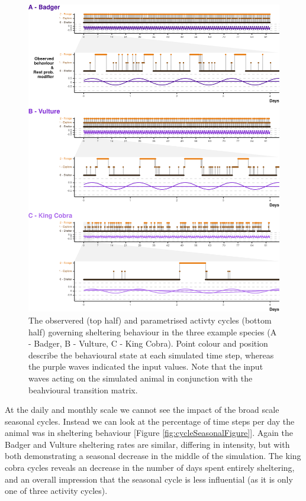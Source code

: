 \documentclass[10pt,a4paper]{article}
\begin{document}
\begin{figure}

{\centering \includegraphics{Agent-based_model_walkthrough_files/figure-latex/cycleFigure-1} 

}

\caption{The observered (top half) and parametrised activty cycles (bottom half) governing sheltering behaviour in the three example species (A - Badger, B - Vulture, C - King Cobra). Point colour and position describe the behavioural state at each simulated time step, whereas the purple waves indicated the input values. Note that the input waves acting on the simulated animal in conjunction with the beahvioural transition matrix.}\label{fig:cycleFigure}
\end{figure}

At the daily and monthly scale we cannot see the impact of the broad scale seasonal cycles.
Instead we can look at the percentage of time steps per day the animal was in sheltering behaviour {[}Figure \ref{fig:cycleSeasonalFigure}{]}.
Again the Badger and Vulture sheltering rates are similar, differing in intensity, but with both demonstrating a seasonal decrease in the middle of the simulation.
The king cobra cycles reveals an decrease in the number of days spent entirely sheltering, and an overall impression that the seasonal cycle is less influential (as it is only one of three activity cycles).
\end{document}
